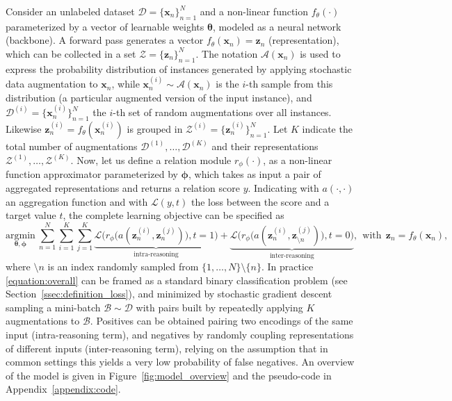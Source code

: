 \documentclass{article}
\begin{document}
Consider an unlabeled dataset $\mathcal{D}=\{ \mathbf{x}_n \}_{n=1}^{N}$ and a non-linear function $f_{\theta}(\cdot)$ parameterized by a vector of learnable weights $\boldsymbol{\theta}$, modeled as a neural network (backbone). A forward pass generates a vector $f_{\theta}(\mathbf{x}_{n})=\mathbf{z}_n$ (representation), which can be collected in a set $\mathcal{Z} = \{ \mathbf{z}_{n} \}_{n=1}^{N}$.
The notation $\mathcal{A}(\mathbf{x}_{n})$ is used to express the probability distribution of instances generated by applying stochastic data augmentation to $\mathbf{x}_{n}$, while $\mathbf{x}_{n}^{(i)} \sim \mathcal{A}(\mathbf{x}_{n})$ is the $i$-th sample from this distribution (a particular augmented version of the input instance), and $\mathcal{D}^{(i)}=\{ \mathbf{x}^{(i)}_n \}_{n=1}^{N}$ the $i$-th set of random augmentations over all instances.
Likewise $\mathbf{z}_{n}^{(i)}=f_{\theta}(\mathbf{x}_{n}^{(i)})$ is grouped in $\mathcal{Z}^{(i)} = \{ \mathbf{z}^{(i)}_{n} \}_{n=1}^{N}$. Let $K$ indicate the total number of augmentations $\mathcal{D}^{(1)},\ldots,\mathcal{D}^{(K)}$ and their representations $\mathcal{Z}^{(1)},\ldots,\mathcal{Z}^{(K)}$.
Now, let us define a relation module $r_{\phi}(\cdot)$, as a non-linear function approximator parameterized by $\boldsymbol{\phi}$, which takes as input a pair of aggregated representations and returns a relation score $y$. Indicating with $a(\cdot, \cdot)$ an aggregation function and with $\mathcal{L}(y, t)$ the loss between the score and a target value $t$, the complete learning objective can be specified as
\begin{equation}\label{equation:overall}
    \underset{\boldsymbol{\theta}, \boldsymbol{\phi}}{\text{argmin}}
    \
    \sum_{n=1}^{N} \sum_{i=1}^{K} \sum_{j=1}^{K} 
    \underbrace{\mathcal{L}\Big( r_{\phi} \big( a(\mathbf{z}_{n}^{(i)}, \mathbf{z}_{n}^{(j)}) \big) , t=1 \Big)}_{\text{intra-reasoning}}
    +
    \underbrace{\mathcal{L}\Big( r_{\phi} \big( a(\mathbf{z}_{n}^{(i)}, \mathbf{z}_{\setminus n}^{(j)}) \big) , t=0 \Big)}_{\text{inter-reasoning}},
    \ \
    \text{with}
    \ \
    \mathbf{z}_{n} = f_{\theta}(\mathbf{x}_{n}),
\end{equation}
where $\setminus n$ is an index randomly sampled from $\{1, \ldots, N \} \setminus \{ n \}$. 
In practice \eqref{equation:overall} can be framed as a standard binary classification problem (see Section~\ref{ssec:definition_loss}), and minimized by stochastic gradient descent sampling a mini-batch $\mathcal{B} \sim \mathcal{D}$ with pairs built by repeatedly applying $K$ augmentations to $\mathcal{B}$. Positives can be obtained pairing two encodings of the same input (intra-reasoning term), and negatives by randomly coupling representations of different inputs (inter-reasoning term), relying on the assumption that in common settings this yields a very low probability of false negatives.
An overview of the model is given in Figure~\ref{fig:model_overview} and the pseudo-code in Appendix~\ref{appendix:code}.
\end{document}
